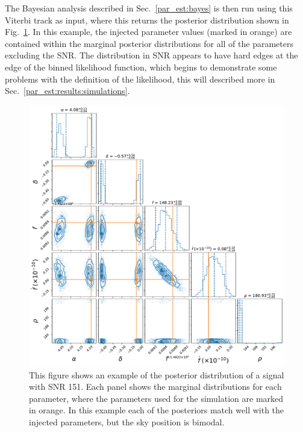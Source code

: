 The Bayesian analysis described in Sec.~\ref{par_est:bayes} is then run using
this Viterbi track as input, where this returns the posterior distribution
shown in Fig.~\ref{par_est:results:example_posterior}.  In this example, the
injected parameter values (marked in orange) are contained within the marginal
posterior distributions for all of the parameters excluding the \gls{SNR}.  The
distribution in \gls{SNR} appears to have hard edges at the edge of the binned
likelihood function, which begins to demonstrate some problems with the
definition of the likelihood, this will described more in Sec.~\ref{par_est:results:simulations}.
%
\begin{figure}[pt]
    \centering
    \includegraphics[width=\linewidth]{C5_parameter/cornerplot.pdf}
    \caption[KDE of likelihood in different \gls{SNR} ranges]{This figure shows
an example of the posterior distribution of a signal with \gls{SNR} 151. Each
panel shows the marginal distributions for each parameter, where the parameters
used for the simulation are marked in orange. In this example each of the
posteriors match well with the injected parameters, but the sky position is
bimodal.~}
\label{par_est:results:example_posterior}    
\end{figure}
%


